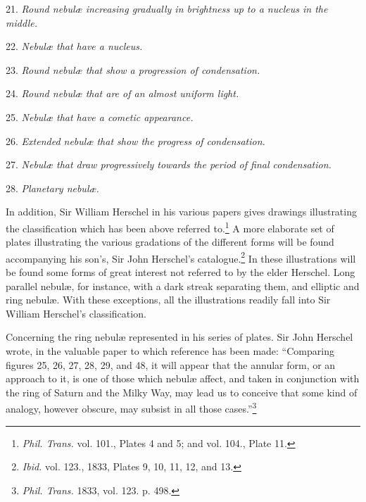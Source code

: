 \documentclass[a4paper, 12pt, oneside, polutonikogreek, english]{article}
\begin{document}
21. \emph{Round nebulæ increasing gradually in brightness up to a nucleus in the middle.}

22. \emph{Nebulæ that have a nucleus.}

23. \emph{Round nebulæ that show a progression of condensation.}

24. \emph{Round nebulæ that are of an almost uniform light.}

25. \emph{Nebulæ that have a cometic appearance.}

26. \emph{Extended nebulæ that show the progress of condensation.}

27. \emph{Nebulæ that draw progressively towards the period of final condensation.}

28. \emph{Planetary nebulæ.}

In addition, Sir William Herschel in his various papers gives drawings illustrating the classification which has been above referred to.\footnote{\emph{Phil. Trans.} vol. 101., Plates 4 and 5; and vol. 104., Plate 11.} A more elaborate set of plates illustrating the various gradations of the different forms will be found accompanying his son's, Sir John Herschel's catalogue.\footnote{\emph{Ibid.} vol. 123., 1833, Plates 9, 10, 11, 12, and 13.} In these illustrations will be found some forms of great interest not referred to by the elder Herschel. Long parallel nebulæ, for instance, with a dark streak separating them, and elliptic and ring nebulæ. With these exceptions, all the illustrations readily fall into Sir William Herschel's classification.

Concerning the ring nebulæ represented in his series of plates. Sir John Herschel wrote, in the valuable paper to which reference has been made: ``Comparing figures 25, 26, 27, 28, 29, and 48, it will appear that the annular form, or an approach to it, is one of those which nebulæ affect, and taken in conjunction with the ring of Saturn and the Milky Way, may lead us to conceive that some kind of analogy, however obscure, may subsist in all those cases.''\footnote{\emph{Phil. Trans.} 1833, vol. 123. p. 498.}
\end{document}
